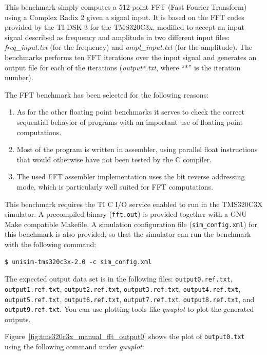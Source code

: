 This benchmark simply computes a 512-point FFT (Fast Fourier Transform) using a Complex Radix 2 given a signal input.
It is based on the FFT codes provided by the TI DSK 3 for the TMS320C3x, modified to accept an input signal described as frequency and amplitude in two different input files: \textit{freq\_input.txt} (for the frequency) and \textit{ampl\_input.txt} (for the amplitude).
The benchmarks performs ten FFT iterations over the input signal and generates an output file for each of the iterations (\textit{output*.txt}, where ``*'' is the iteration number).

The FFT benchmark has been selected for the following reasons:
\begin{enumerate}
	\item As for the other floating point benchmarks it serves to check the correct sequential behavior of programs with an important use of floating point computations.
	\item Most of the program is written in assembler, using parallel float instructions that would otherwise have not been tested by the C compiler.
	\item The used FFT assembler implementation uses the bit reverse addressing mode, which is particularly well suited for FFT computations.
\end{enumerate} 

This benchmark requires the TI C I/O service enabled to run in the TMS320C3X simulator.
A precompiled binary (\texttt{fft.out}) is provided together with a GNU Make compatible Makefile.
A simulation configuration file (\texttt{sim\_config.xml}) for this benchmark is also provided, so that the simulator can run the benchmark with the following command:

\begin{verbatim}
$ unisim-tms320c3x-2.0 -c sim_config.xml
\end{verbatim}

The expected output data set is in the following files: \texttt{output0.ref.txt}, \texttt{output1.ref.txt}, \texttt{output2.ref.txt}, \texttt{output3.ref.txt}, \texttt{output4.ref.txt}, \texttt{output5.ref.txt}, \texttt{output6.ref.txt}, \texttt{output7.ref.txt}, \texttt{output8.ref.txt}, and \texttt{output9.ref.txt}.
You can use plotting tools like \textit{gnuplot} to plot the generated outputs. 

Figure~\ref{fig:tms320c3x_manual_fft_output0} shows the plot of \texttt{output0.txt} using the following command under \textit{gnuplot}:


